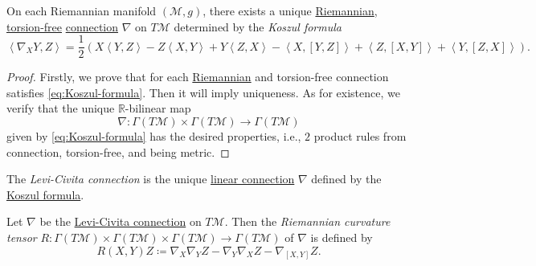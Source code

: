 \begin{proposition}\label{prop:Koszul-formula}
	On each Riemannian manifold \((\mathcal{M} , g)\), there exists a unique \hyperref[def:Riemannian]{Riemannian}, \hyperref[def:torsion-free]{torsion-free} \hyperref[def:linear-connection]{connection} \(\nabla \) on \(T\mathcal{M} \) determined by the \emph{Koszul formula}
	\begin{equation}\label{eq:Koszul-formula}
		\left\langle \nabla _X Y, Z \right\rangle = \frac{1}{2} \left( X \left\langle Y, Z \right\rangle - Z\left\langle X, Y \right\rangle + Y\left\langle Z, X \right\rangle - \left\langle X, [Y, Z] \right\rangle + \left\langle Z, [X, Y] \right\rangle + \left\langle Y, [Z, X] \right\rangle \right).
	\end{equation}
\end{proposition}
\begin{proof}
	Firstly, we prove that for each \hyperref[def:Riemannian]{Riemannian} and torsion-free connection satisfies \autoref{eq:Koszul-formula}. Then it will imply uniqueness. As for existence, we verify that the unique \(\mathbb{R} \)-bilinear map
	\[
		\nabla \colon \Gamma (T \mathcal{M} ) \times \Gamma (T \mathcal{M} )\to \Gamma (T\mathcal{M} )
	\]
	given by \autoref{eq:Koszul-formula} has the desired properties, i.e., \(2\) product rules from connection, torsion-free, and being metric.
\end{proof}

\begin{definition}\label{def:Levi-Civita-connection}
	The \emph{Levi-Civita connection} is the unique \hyperref[def:linear-connection]{linear connection} \(\nabla \) defined by the \hyperref[eq:Koszul-formula]{Koszul formula}.
\end{definition}

\begin{definition}\label{def:Riemannian-curvature-tensor}
	Let \(\nabla \) be the \hyperref[def:Levi-Civita-connection]{Levi-Civita connection} on \(T \mathcal{M} \). Then the \emph{Riemannian curvature tensor} \(R\colon \Gamma (T \mathcal{M} ) \times \Gamma (T \mathcal{M} )\times \Gamma (T \mathcal{M} ) \to \Gamma (T \mathcal{M} )\) of \(\nabla \) is defined by
	\[
		R(X, Y)Z \coloneqq \nabla _X \nabla _Y Z - \nabla _Y \nabla _X Z - \nabla _{[X, Y]}Z.
	\]
\end{definition}